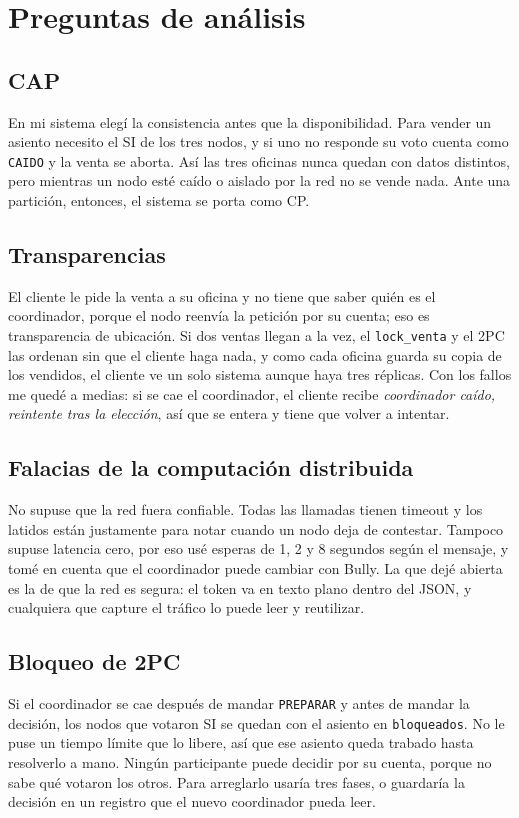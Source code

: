 \documentclass[11pt,a4paper]{article}
\begin{document}
\section{Preguntas de análisis}

\subsection{CAP}
En mi sistema elegí la consistencia antes que la disponibilidad. Para
vender un asiento necesito el SI de los tres nodos, y si uno no responde su
voto cuenta como \texttt{CAIDO} y la venta se aborta. Así las tres oficinas
nunca quedan con datos distintos, pero mientras un nodo esté caído o
aislado por la red no se vende nada. Ante una partición, entonces, el
sistema se porta como CP.

\subsection{Transparencias}
El cliente le pide la venta a su oficina y no tiene que saber quién es el
coordinador, porque el nodo reenvía la petición por su cuenta; eso es
transparencia de ubicación. Si dos ventas llegan a la vez, el
\texttt{lock\_venta} y el 2PC las ordenan sin que el cliente haga nada, y
como cada oficina guarda su copia de los vendidos, el cliente ve un solo
sistema aunque haya tres réplicas. Con los fallos me quedé a medias: si se
cae el coordinador, el cliente recibe \emph{coordinador caído, reintente tras
la elección}, así que se entera y tiene que volver a intentar.

\subsection{Falacias de la computación distribuida}
No supuse que la red fuera confiable. Todas las llamadas tienen timeout y
los latidos están justamente para notar cuando un nodo deja de contestar.
Tampoco supuse latencia cero, por eso usé esperas de 1, 2 y 8 segundos
según el mensaje, y tomé en cuenta que el coordinador puede cambiar con
Bully. La que dejé abierta es la de que la red es segura: el token va en
texto plano dentro del JSON, y cualquiera que capture el tráfico lo puede
leer y reutilizar.

\subsection{Bloqueo de 2PC}
Si el coordinador se cae después de mandar \texttt{PREPARAR} y antes de
mandar la decisión, los nodos que votaron SI se quedan con el asiento en
\texttt{bloqueados}. No le puse un tiempo límite que lo libere, así que ese
asiento queda trabado hasta resolverlo a mano. Ningún participante puede
decidir por su cuenta, porque no sabe qué votaron los otros. Para
arreglarlo usaría tres fases, o guardaría la decisión en un registro que el
nuevo coordinador pueda leer.
\end{document}
